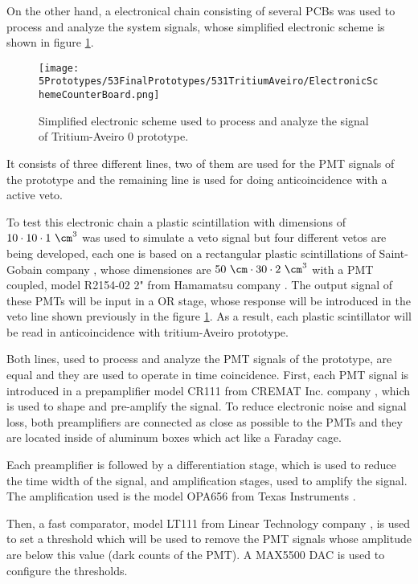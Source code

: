 On the other hand, a electronical chain consisting of several PCBs was used to process and analyze the system signals, whose simplified electronic scheme is shown in figure \ref{fig:ElectronicSchemCounterBoard}.

\begin{figure}[h]
\centering
\texttt{[image: 5Prototypes/53FinalPrototypes/531TritiumAveiro/ElectronicSchemeCounterBoard.png]}
\caption{Simplified electronic scheme used to process and analyze the signal of Tritium-Aveiro 0 prototype. \label{fig:ElectronicSchemCounterBoard}}
\end{figure}

It consists of three different lines, two of them are used for the PMT signals of the prototype and the remaining line is used for doing anticoincidence with a active veto.

To test this electronic chain a plastic scintillation with dimensions of $10 \cdot{} 10 \cdot{} 1~\cm^3$ was used to simulate a veto signal but four different vetos are being developed, each one is based on a rectangular plastic scintillations of Saint-Gobain company \cite{VetoAveiro}, whose dimensiones are $50~\cm \cdot{} 30 \cdot{} 2~\cm^3$  with a PMT coupled, model R2154-02 2" from Hamamatsu company \cite{DataSheetPMTsAveiro}. The output signal of these PMTs will be input in a OR stage, whose response will be introduced in the veto line shown previously in the figure \ref{fig:ElectronicSchemCounterBoard}. As a result, each plastic scintillator will be read in anticoincidence with tritium-Aveiro prototype.

Both lines, used to process and analyze the PMT signals of the prototype, are equal and they are used to operate in time coincidence. First, each PMT signal is introduced in a prepamplifier model CR111 from CREMAT Inc. company \cite{CREMATPreAmplifierDataSheet}, which is used to shape and pre-amplify the signal. To reduce electronic noise and signal loss, both preamplifiers are connected as close as possible to the PMTs and they are located inside of aluminum boxes which act like a Faraday cage.

Each preamplifier is followed by a differentiation stage, which is used to reduce the time width of the signal, and amplification stages, used to amplify the signal. The amplification used is the model OPA656 from Texas Instruments \cite{OPA656}. 

Then, a fast comparator, model LT111 from Linear Technology company \cite{LT111}, is used to set a threshold which will be used to remove the PMT signals whose amplitude are below this value (dark counts of the PMT). A MAX5500 DAC is used to configure the thresholds.

